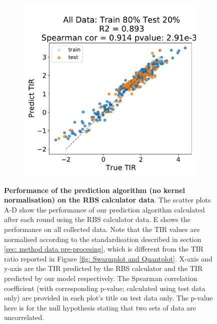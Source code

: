 \begin{figure}[!ht]
\begin{subfigure}[b]{0.49\textwidth}
    \end{subfigure}
    \begin{subfigure}[b]{0.49\textwidth}
        \centering
        \caption{}
        \includegraphics[scale=0.4]{plots/Supplementary/salis_scatter_abc1_FF_4.pdf}
    \end{subfigure}
    \caption{\textbf{Performance of the prediction algorithm (no kernel normalisation) on the RBS calculator data}. The scatter plots A-D show the performance of our prediction algorithm calculated after each round using the RBS calculator data.
    E shows the performance on all collected data.
    Note that the TIR values are normalised according to the standardisation described in section \ref{sec: method data pre-procesing}, which is different from the TIR ratio reported in Figure \ref{fig: Swarmplot and Quantplot}.
    X-axis and y-axis are the TIR predicted by the RBS calculator and the TIR predicted by our model respectively.
    The Spearman correlation coefficient (with corresponding p-value; calculated using test data only) are provided in each plot's title on test data only.
    The p-value here is for the null hypothesis stating that two sets of data are uncorrelated.
    }
    \label{fig: Scatterplot_Salis}
\end{figure}


